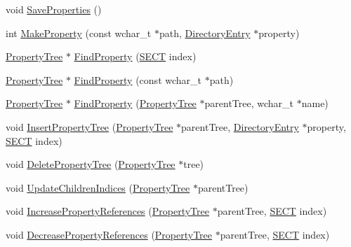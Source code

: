 \begin{DoxyCompactItemize}
\item 
void \hyperlink{class_y_compound_files_1_1_compound_file_a7c4e2d7eb98cb517d55aae698e93fc98}{Save\+Properties} ()
\item 
int \hyperlink{class_y_compound_files_1_1_compound_file_a526032a834468f88b4fe279972d84c9c}{Make\+Property} (const wchar\+\_\+t $\ast$path, \hyperlink{class_y_compound_files_1_1_compound_file_1_1_directory_entry}{Directory\+Entry} $\ast$property)
\item 
\hyperlink{class_y_compound_files_1_1_compound_file_1_1_property_tree}{Property\+Tree} $\ast$ \hyperlink{class_y_compound_files_1_1_compound_file_a89b6ac366834b96dad306b8afae77fec}{Find\+Property} (\hyperlink{_basic_excel_8hpp_a784c2e2144ab372c047faeeb0f6a9e6b}{S\+E\+C\+T} index)
\item 
\hyperlink{class_y_compound_files_1_1_compound_file_1_1_property_tree}{Property\+Tree} $\ast$ \hyperlink{class_y_compound_files_1_1_compound_file_acb840d5db5b84d5aa8f066f9fc3316d4}{Find\+Property} (const wchar\+\_\+t $\ast$path)
\item 
\hyperlink{class_y_compound_files_1_1_compound_file_1_1_property_tree}{Property\+Tree} $\ast$ \hyperlink{class_y_compound_files_1_1_compound_file_a22ed7fbd2d55f70a456fb3bb49e83e41}{Find\+Property} (\hyperlink{class_y_compound_files_1_1_compound_file_1_1_property_tree}{Property\+Tree} $\ast$parent\+Tree, wchar\+\_\+t $\ast$name)
\item 
void \hyperlink{class_y_compound_files_1_1_compound_file_a0106098f394b20eb07536b3898039ff2}{Insert\+Property\+Tree} (\hyperlink{class_y_compound_files_1_1_compound_file_1_1_property_tree}{Property\+Tree} $\ast$parent\+Tree, \hyperlink{class_y_compound_files_1_1_compound_file_1_1_directory_entry}{Directory\+Entry} $\ast$property, \hyperlink{_basic_excel_8hpp_a784c2e2144ab372c047faeeb0f6a9e6b}{S\+E\+C\+T} index)
\item 
void \hyperlink{class_y_compound_files_1_1_compound_file_ad37847867f946396bc545bab73f1066d}{Delete\+Property\+Tree} (\hyperlink{class_y_compound_files_1_1_compound_file_1_1_property_tree}{Property\+Tree} $\ast$tree)
\item 
void \hyperlink{class_y_compound_files_1_1_compound_file_a35140b5b01714e81a4393c73fcb22b2a}{Update\+Children\+Indices} (\hyperlink{class_y_compound_files_1_1_compound_file_1_1_property_tree}{Property\+Tree} $\ast$parent\+Tree)
\item 
void \hyperlink{class_y_compound_files_1_1_compound_file_a50ed04c43e1d286037509fa6adfe2865}{Increase\+Property\+References} (\hyperlink{class_y_compound_files_1_1_compound_file_1_1_property_tree}{Property\+Tree} $\ast$parent\+Tree, \hyperlink{_basic_excel_8hpp_a784c2e2144ab372c047faeeb0f6a9e6b}{S\+E\+C\+T} index)
\item 
void \hyperlink{class_y_compound_files_1_1_compound_file_ad41516e12f1d07dabc34ad5417380cf3}{Decrease\+Property\+References} (\hyperlink{class_y_compound_files_1_1_compound_file_1_1_property_tree}{Property\+Tree} $\ast$parent\+Tree, \hyperlink{_basic_excel_8hpp_a784c2e2144ab372c047faeeb0f6a9e6b}{S\+E\+C\+T} index)
\end{DoxyCompactItemize}
